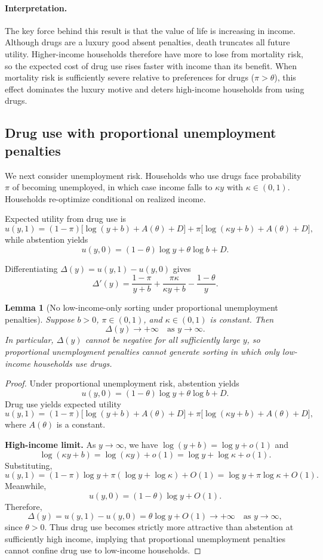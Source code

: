 \documentclass[parskip=full]{article}
\theoremstyle{plain}      %
\newtheorem{lemma}{Lemma}
\theoremstyle{remark}    %
\begin{document}
\paragraph{Interpretation.}
The key force behind this result is that the value of life is increasing in income. Although drugs are a luxury good absent penalties, death truncates all future utility. Higher-income households therefore have more to lose from mortality risk, so the expected cost of drug use rises faster with income than its benefit. When mortality risk is sufficiently severe relative to preferences for drugs ($\pi>\theta$), this effect dominates the luxury motive and deters high-income households from using drugs.

\subsection{Drug use with proportional unemployment penalties}

We next consider unemployment risk. Households who use drugs face probability $\pi$ of becoming unemployed, in which case income falls to $\kappa y$ with $\kappa\in(0,1)$. Households re-optimize conditional on realized income.

Expected utility from drug use is
\[u(y,1)=(1-\pi)\big[\log(y+b)+A(\theta)+D\big]
+\pi\big[\log(\kappa y+b)+A(\theta)+D\big],\]
while abstention yields
\[u(y,0)=(1-\theta)\log y+\theta\log b + D.\]

Differentiating $\Delta(y)=u(y,1)-u(y,0)$ gives
\[\Delta'(y)=\frac{1-\pi}{y+b}+\frac{\pi\kappa}{\kappa y+b}-\frac{1-\theta}{y}.\]

\begin{lemma}[No low-income-only sorting under proportional unemployment penalties]
Suppose $b>0$, $\pi\in(0,1)$, and $\kappa\in(0,1)$ is constant.
Then
\[\Delta(y)\to +\infty \quad \text{as } y\to\infty.\]
In particular, $\Delta(y)$ cannot be negative for all sufficiently large $y$,
so proportional unemployment penalties cannot generate sorting in which only
low-income households use drugs.
\end{lemma}

\begin{proof}
Under proportional unemployment risk, abstention yields
\[u(y,0)=(1-\theta)\log y+\theta\log b + D.\]
Drug use yields expected utility
\[u(y,1)=(1-\pi)\big[\log(y+b)+A(\theta)+D\big] +\pi\big[\log(\kappa y+b)+A(\theta)+D\big],\]
where $A(\theta)$ is a constant.

\medskip
\noindent\textbf{High-income limit.}
As $y\to\infty$, we have $\log(y+b)=\log y+o(1)$ and
\[\log(\kappa y+b)=\log(\kappa y)+o(1)=\log y + \log\kappa + o(1).\]
Substituting,
\[u(y,1)=(1-\pi)\log y + \pi(\log y+\log\kappa) + O(1) =\log y + \pi\log\kappa + O(1).\]
Meanwhile,
\[u(y,0)=(1-\theta)\log y + O(1).\]
Therefore,
\[\Delta(y)=u(y,1)-u(y,0)=\theta\log y + O(1)\to +\infty
\quad \text{as } y\to\infty,\]
since $\theta>0$.
Thus drug use becomes strictly more attractive than abstention at sufficiently
high income, implying that proportional unemployment penalties cannot confine
drug use to low-income households.
\end{proof}
\end{document}
